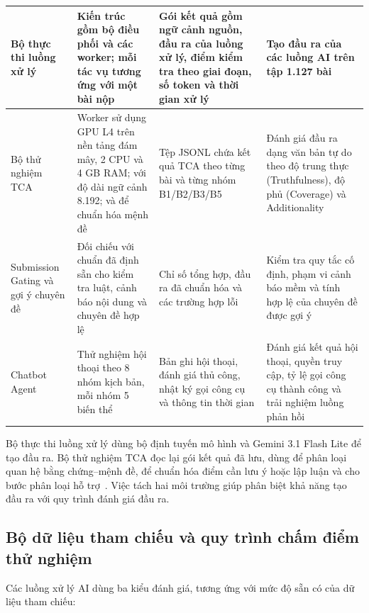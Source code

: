 \begin{PrismLongTable}
\begin{longtable}{|P{0.235\textwidth}|P{0.235\textwidth}|P{0.235\textwidth}|P{0.235\textwidth}|}
  Bộ thực thi luồng xử lý      &      Kiến trúc gồm bộ điều phối và các worker; mỗi tác vụ tương ứng với một bài nộp      &      Gói kết quả gồm ngữ cảnh nguồn, đầu ra của luồng xử lý, điểm kiểm tra theo giai đoạn, số token và thời gian xử lý      &      Tạo đầu ra của các luồng AI trên tập 1.127 bài \\ \hline
  Bộ thử nghiệm TCA     &     Worker sử dụng GPU L4 trên nền tảng đám mây, 2 CPU và 4 GB RAM;  với độ dài ngữ cảnh 8.192;  và  để chuẩn hóa mệnh đề~\cite{ch4ref2,ch4ref3}     &     Tệp JSONL chứa kết quả TCA theo từng bài và từng nhóm B1/B2/B3/B5     &     Đánh giá đầu ra dạng văn bản tự do theo độ trung thực (Truthfulness), độ phủ (Coverage) và Additionality \\ \hline
  Submission Gating và gợi ý chuyên đề      &      Đối chiếu với chuẩn đã định sẵn cho kiểm tra luật, cảnh báo nội dung và chuyên đề hợp lệ      &      Chỉ số tổng hợp, đầu ra đã chuẩn hóa và các trường hợp lỗi      &      Kiểm tra quy tắc cố định, phạm vi cảnh báo mềm và tính hợp lệ của chuyên đề được gợi ý \\ \hline
  Chatbot Agent     &     Thử nghiệm hội thoại theo 8 nhóm kịch bản, mỗi nhóm 5 biến thể     &     Bản ghi hội thoại, đánh giá thủ công, nhật ký gọi công cụ và thông tin thời gian     &     Đánh giá kết quả hội thoại, quyền truy cập, tỷ lệ gọi công cụ thành công và trải nghiệm luồng phản hồi \\ \hline
\end{longtable}
\end{PrismLongTable}

Bộ thực thi luồng xử lý dùng bộ định tuyến mô hình và Gemini 3.1 Flash Lite để tạo đầu ra. Bộ thử nghiệm TCA đọc lại gói kết quả đã lưu, dùng  để phân loại quan hệ bằng chứng--mệnh đề,  để chuẩn hóa điểm cần lưu ý hoặc lập luận và  cho bước phân loại hỗ trợ~\cite{ch4ref2,ch4ref3}. Việc tách hai môi trường giúp phân biệt khả năng tạo đầu ra với quy trình đánh giá đầu ra.

\subsection{Bộ dữ liệu tham chiếu và quy trình chấm điểm thử nghiệm}

Các luồng xử lý AI dùng ba kiểu đánh giá, tương ứng với mức độ sẵn có của dữ liệu tham chiếu:

